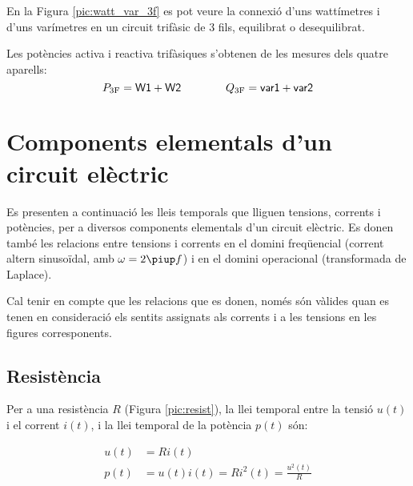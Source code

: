 En la Figura \vref{pic:watt_var_3f} es pot veure la connexió d'uns
wattímetres i d'uns varímetres en un circuit trifàsic de 3 fils,
equilibrat o desequilibrat.

\begin{center}
\centering
    
    \label{pic:watt_var_3f}
\end{center}

Les potències activa i reactiva trifàsiques s'obtenen de les mesures
dels quatre aparells:
\begin{equation}
    P_\mathrm{3F} = \textsf{W1} +  \textsf{W2}
    \qquad\qquad Q_\mathrm{3F} = \textsf{var1} +  \textsf{var2}
\end{equation}


\section{Components elementals d'un circuit
elèctric}\label{sec:comp_elem}

Es presenten a continuació les lleis temporals que lliguen tensions,
corrents i potències, per a diversos components elementals d'un
circuit elèctric. Es donen també les relacions entre tensions i
corrents en el domini freqüencial (corrent altern sinusoïdal, amb
$\omega=2\piup f$) i en el domini operacional (transformada de
Laplace).

Cal tenir en compte que les relacions que es donen, només són
vàlides  quan es tenen en consideració els sentits assignats als
corrents i a les tensions en les figures corresponents.

\subsection{Resistència} 

Per a una resistència $R$ (Figura
\vref{pic:resist}), la llei temporal entre la tensió $u(t)$ i el
corrent $i(t)$, i la llei temporal de la potència $p(t)$ són:


\hfill
\begin{minipage}[b]{5cm}
    
    \label{pic:resist}
\end{minipage}
\hfill
\begin{minipage}[b][3.25cm][t]{8cm}
   \begin{align}
      u(t) &= R i(t) \\  p(t) &= u(t) i(t) = R i^2(t) = \frac{u^2(t)}{R}
   \end{align}
\end{minipage}

